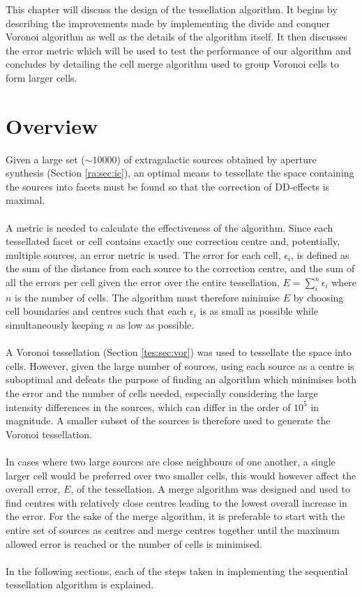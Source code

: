 This chapter will discuss the design of the tessellation algorithm. It begins by describing the improvements made by implementing the divide and conquer Voronoi algorithm as well as the details of the algorithm itself. It then discusses the error metric which will be used to test the performance of our algorithm and concludes by detailing the cell merge algorithm used to group Voronoi cells to form larger cells.
\section{Overview}
Given a large set ($\sim10000$) of extragalactic sources obtained by aperture synthesis (Section \ref{ra:sec:ic}), an optimal means to tessellate the space containing the sources into facets must be found so that the correction of DD-effects is maximal.
\\
\\
A metric is needed to calculate the effectiveness of the algorithm. Since each tessellated facet or cell contains exactly one correction centre and, potentially, multiple sources, an error metric is used. The error for each cell, $\epsilon_i$, is defined as the sum of the distance from each source to the correction centre, and the sum of all the errors per cell given the error over the entire tessellation, $E = \sum^n_i \epsilon_i$ where $n$ is the number of cells. The algorithm must therefore minimise $E$ by choosing cell boundaries and centres such that each $\epsilon_i$ is as small as possible while simultaneously keeping $n$ as low as possible.
\\
\\
A Voronoi tessellation (Section \ref{tes:sec:vor}) was used to tessellate the space into cells. However, given the large number of sources, using each source as a centre is suboptimal and defeats the purpose of finding an algorithm which minimises both the error and the number of cells needed, especially considering the large intensity differences in the sources, which can differ in the order of $10^5$ in magnitude. A smaller subset of the sources is therefore used to generate the Voronoi tessellation.
\\
\\
In cases where two large sources are close neighbours of one another, a single larger cell would be preferred over two smaller cells, this would however affect the overall error, $E$, of the tessellation. A merge algorithm was designed and used to find centres with relatively close centres leading to the lowest overall increase in the error. For the sake of the merge algorithm, it is preferable to start with the entire set of sources as centres and merge centres together until the maximum allowed error is reached or the number of cells is minimised.
\\
\\
In the following sections, each of the steps taken in implementing the sequential tessellation algorithm is explained.